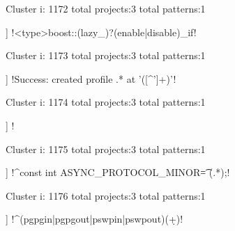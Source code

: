Cluster i: 1172
total projects:3
total patterns:1
\begin{multicols}{1}
\begin{description}[noitemsep,topsep=0pt]
\item [[3] ] \cverb!<type>boost::(lazy_)?(enable|disable)_if!
\end{description}
\end{multicols}







Cluster i: 1173
total projects:3
total patterns:1
\begin{multicols}{1}
\begin{description}[noitemsep,topsep=0pt]
\item [[3] ] \cverb!Success: created profile .* at '([^']+)'!
\end{description}
\end{multicols}







Cluster i: 1174
total projects:3
total patterns:1
\begin{multicols}{1}
\begin{description}[noitemsep,topsep=0pt]
\item [[3] ] \cverb!%
\end{description}
\end{multicols}







Cluster i: 1175
total projects:3
total patterns:1
\begin{multicols}{1}
\begin{description}[noitemsep,topsep=0pt]
\item [[3] ] \cverb!^const int ASYNC_PROTOCOL_MINOR\t*= (.*);!
\end{description}
\end{multicols}







Cluster i: 1176
total projects:3
total patterns:1
\begin{multicols}{1}
\begin{description}[noitemsep,topsep=0pt]
\item [[3] ] \cverb!^(pgpgin|pgpgout|pswpin|pswpout)\s(\d+)!
\end{description}
\end{multicols}







